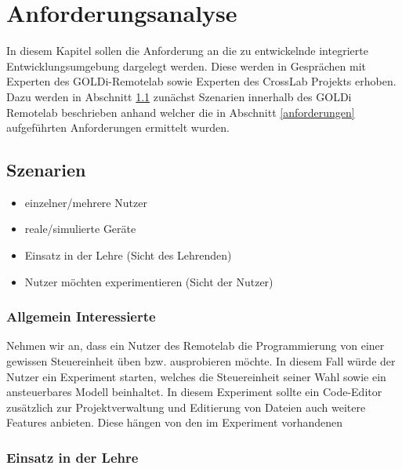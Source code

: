 \chapter{Anforderungsanalyse} \label{anforderungsanalyse}

In diesem Kapitel sollen die Anforderung an die zu entwickelnde integrierte Entwicklungsumgebung dargelegt werden. Diese werden in Gesprächen mit Experten des GOLDi-Remotelab sowie Experten des CrossLab Projekts erhoben. Dazu werden in Abschnitt \ref{szenarien} zunächst Szenarien innerhalb des GOLDi Remotelab beschrieben anhand welcher die in Abschnitt \ref{anforderungen} aufgeführten Anforderungen ermittelt wurden.

\section{Szenarien} \label{szenarien}

\begin{itemize}
    \item einzelner/mehrere Nutzer
    \item reale/simulierte Geräte
    \item Einsatz in der Lehre (Sicht des Lehrenden)
    \item Nutzer möchten experimentieren (Sicht der Nutzer)
\end{itemize}

\subsection{Allgemein Interessierte}

Nehmen wir an, dass ein Nutzer des Remotelab die Programmierung von einer gewissen Steuereinheit üben bzw. ausprobieren möchte. In diesem Fall würde der Nutzer ein Experiment starten, welches die Steuereinheit seiner Wahl sowie ein ansteuerbares Modell beinhaltet. In diesem Experiment sollte ein Code-Editor zusätzlich zur Projektverwaltung und Editierung von Dateien auch weitere Features anbieten. Diese hängen von den im Experiment vorhandenen

\subsection{Einsatz in der Lehre}

